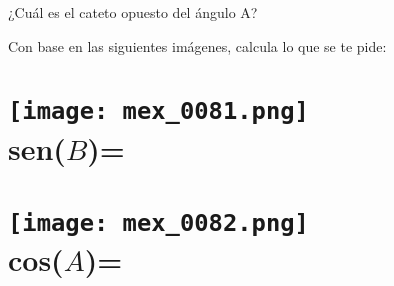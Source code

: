 \documentclass[12pt,addpoints,answers]{evalua}
\begin{document}
\begin{questions}
\begin{multicols}{2}
    \end{multicols}

    \question[] ¿Cuál es el cateto opuesto del ángulo A?
    \begin{multicols}{2}
    \end{multicols}

    \question[] Con base en las siguientes imágenes, calcula lo que se te pide:

    \begin{multicols}{2}
        \begin{parts}
            \part {\Large \texttt{[image: mex\_0081.png]} \\ sen($B$)=\fillin[$0.24$][0cm]}
            \part {\Large \texttt{[image: mex\_0082.png]} \\ cos($A$)=\fillin[$0.60$][0cm]}
        \end{parts}
    \end{multicols}


\end{questions}
\end{document}
